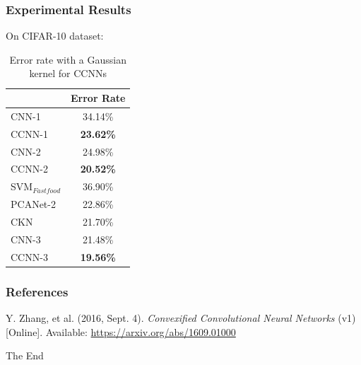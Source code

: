 \documentclass[hyperref={colorlinks}]{beamer}
\begin{document}
\begin{frame}
	\frametitle{Experimental Results}
	On CIFAR-10 dataset:
	\begin{table}
		\begin{tabular}{|l|c|}
			\hline
			 & Error Rate \\
			\hline
			CNN-1 & 34.14\% \\
			CCNN-1 & \textbf{23.62\%} \\
			\hline
			CNN-2 & 24.98\% \\
			CCNN-2 & \textbf{20.52\%} \\
			\hline
			SVM$_{Fastfood}$ & 36.90\% \\
			PCANet-2 & 22.86\% \\
			CKN & 21.70\% \\
			CNN-3 & 21.48\% \\
			CCNN-3 & \textbf{19.56\%} \\
			\hline
		\end{tabular}
		\caption{Error rate with a Gaussian kernel for CCNNs}
		\label{tab:cifar-10-results}
	\end{table}
\end{frame}


\begin{frame}
	\frametitle{References}
	\footnotesize{
		\begin{thebibliography}{9} %
			Y. Zhang, et al. (2016, Sept. 4).
			\emph{Convexified Convolutional Neural Networks} (v1) [Online].
			Available: \url{https://arxiv.org/abs/1609.01000}
		\end{thebibliography}
	}
\end{frame}


\begin{frame}
	\Huge{\centerline{The End}}
\end{frame}
\end{document}
